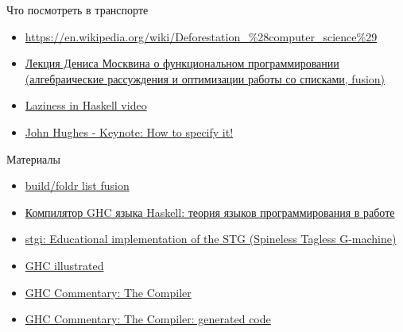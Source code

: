     \begin{frame}{Что посмотреть в транспорте}
        \begin{itemize}
            \item {\color{blue}\url{https://en.wikipedia.org/wiki/Deforestation\_\%28computer\_science\%29}}
            \item \href{https://youtu.be/d3lYx13kdWU?si=ctrQy6pm_44aOgmR}{\color{blue} Лекция Дениса Москвина о функциональном программировании (алгебраические рассуждения и оптимизации работы со списками, fusion)}
            \item \href{https://www.youtube.com/watch?v=fSqE-HSh_NU&list=PLyzwHTVJlRc8620PjqbM0x435-6-Gi1Gu}{\color{blue}Laziness in Haskell video}
            \item \href{https://youtu.be/G0NUOst-53U?si=vdcKVUi9vSPBY0Jz}{\color{blue}John Hughes - Keynote: How to specify it!}
        \end{itemize}
    \end{frame}

    \begin{frame}{Материалы}
        \begin{itemize}
            \item \href{https://wiki.haskell.org/GHC\_optimisations\#Fusion}{\color{blue} build/foldr list fusion}
            \item \href{https://www.lektorium.tv/node/32421}{\color{blue} Компилятор GHC языка Haskell: теория языков программирования в работе}
            \item \href{https://hackage.haskell.org/package/stgi}{\color{blue} stgi: Educational implementation of the STG (Spineless Tagless G-machine)}
            \item \href{https://takenobu-hs.github.io/downloads/haskell_ghc_illustrated.pdf}{\color{blue} GHC illustrated}
            \item \href{https://gitlab.haskell.org/ghc/ghc/-/wikis/commentary/compiler/}{\color{blue} GHC Commentary: The Compiler}
            \item \href{https://gitlab.haskell.org/ghc/ghc/-/wikis/commentary/compiler/generated-code}{\color{blue} GHC Commentary: The Compiler: generated code}
        \end{itemize}
    \end{frame}


